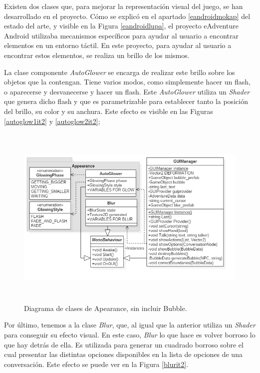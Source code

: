 Existen dos clases que, para mejorar la representación visual del juego, se han desarrollado en el proyecto. Cómo se explicó en el apartado \ref{eandroidmokap} del estado del arte, y visible en la Figura \ref{eandroidlupa}, el proyecto eAdventure Android utilizaba mecanismos específicos para ayudar al usuario a encontrar elementos en un entorno táctil. En este proyecto, para ayudar al usuario a encontrar estos elementos, se realiza un brillo de los mismos.

La clase componente \textit{AutoGlower} se encarga de realizar este brillo sobre los objetos que la contengan. Tiene varios modos, como simplemente hacer un flash, o aparecerse y desvanecerse y hacer un flash. Este \textit{AutoGlower} utiliza un \textit{Shader} que genera dicho flash y que es parametrizable para establecer tanto la posición del brillo, su color y su anchura. Este efecto es visible en las Figuras \ref{autoglow1it2} y \ref{autoglow2it2};

\begin{figure}[h!]
	\centerline{\includegraphics[height=3.5in]{figures/it2/Apearance.png}}
	\caption[Apearance - Versión Final]{Diagrama de clases de Apearance, sin incluir Bubble.}
	\label{apearanceit2}
\end{figure}

Por último, tenemos a la clase \textit{Blur}, que, al igual que la anterior utiliza un \textit{Shader} para conseguir su efecto visual. En este caso, \textit{Blur} lo que hace es volver borroso lo que hay detrás de ella. Es utilizada para generar un cuadrado borroso sobre el cual presentar las distintas opciones disponibles en la lista de opciones de una conversación. Este efecto se puede ver en la Figura \ref{blurit2}.

